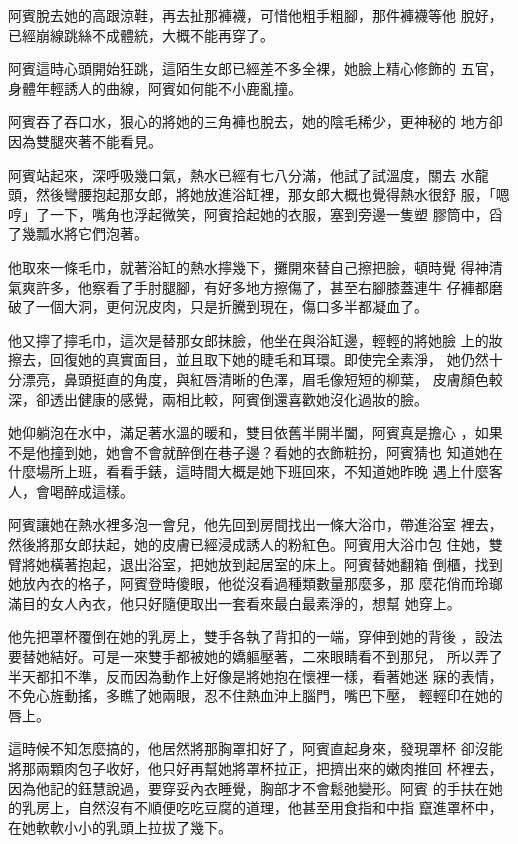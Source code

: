阿賓脫去她的高跟涼鞋，再去扯那褲襪，可惜他粗手粗腳，那件褲襪等他
脫好，已經崩線跳絲不成體統，大概不能再穿了。

阿賓這時心頭開始狂跳，這陌生女郎已經差不多全裸，她臉上精心修飾的
五官，身體年輕誘人的曲線，阿賓如何能不小鹿亂撞。

阿賓吞了吞口水，狠心的將她的三角褲也脫去，她的陰毛稀少，更神秘的
地方卻因為雙腿夾著不能看見。

阿賓站起來，深呼吸幾口氣，熱水已經有七八分滿，他試了試溫度，關去
水龍頭，然後彎腰抱起那女郎，將她放進浴缸裡，那女郎大概也覺得熱水很舒
服，「嗯哼」了一下，嘴角也浮起微笑，阿賓拾起她的衣服，塞到旁邊一隻塑
膠筒中，舀了幾瓢水將它們泡著。

他取來一條毛巾，就著浴缸的熱水擰幾下，攤開來替自己擦把臉，頓時覺
得神清氣爽許多，他察看了手肘腿腳，有好多地方擦傷了，甚至右腳膝蓋連牛
仔褲都磨破了一個大洞，更何況皮肉，只是折騰到現在，傷口多半都凝血了。

他又擰了擰毛巾，這次是替那女郎抹臉，他坐在與浴缸邊，輕輕的將她臉
上的妝擦去，回復她的真實面目，並且取下她的睫毛和耳環。即使完全素淨，
她仍然十分漂亮，鼻頭挺直的角度，與紅唇清晰的色澤，眉毛像短短的柳葉，
皮膚顏色較深，卻透出健康的感覺，兩相比較，阿賓倒還喜歡她沒化過妝的臉。

她仰躺泡在水中，滿足著水溫的暖和，雙目依舊半開半闔，阿賓真是擔心
，如果不是他撞到她，她會不會就醉倒在巷子邊？看她的衣飾粧扮，阿賓猜也
知道她在什麼場所上班，看看手錶，這時間大概是她下班回來，不知道她昨晚
遇上什麼客人，會喝醉成這樣。

阿賓讓她在熱水裡多泡一會兒，他先回到房間找出一條大浴巾，帶進浴室
裡去，然後將那女郎扶起，她的皮膚已經浸成誘人的粉紅色。阿賓用大浴巾包
住她，雙臂將她橫著抱起，退出浴室，把她放到起居室的床上。阿賓替她翻箱
倒櫃，找到她放內衣的格子，阿賓登時傻眼，他從沒看過種類數量那麼多，那
麼花俏而玲瑯滿目的女人內衣，他只好隨便取出一套看來最白最素淨的，想幫
她穿上。

他先把罩杯覆倒在她的乳房上，雙手各執了背扣的一端，穿伸到她的背後
，設法要替她結好。可是一來雙手都被她的嬌軀壓著，二來眼睛看不到那兒，
所以弄了半天都扣不準，反而因為動作上好像是將她抱在懷裡一樣，看著她迷
寐的表情，不免心旌動搖，多瞧了她兩眼，忍不住熱血沖上腦門，嘴巴下壓，
輕輕印在她的唇上。

這時候不知怎麼搞的，他居然將那胸罩扣好了，阿賓直起身來，發現罩杯
卻沒能將那兩顆肉包子收好，他只好再幫她將罩杯拉正，把擠出來的嫩肉推回
杯裡去，因為他記的鈺慧說過，要穿妥內衣睡覺，胸部才不會鬆弛變形。阿賓
的手扶在她的乳房上，自然沒有不順便吃吃豆腐的道理，他甚至用食指和中指
竄進罩杯中，在她軟軟小小的乳頭上拉拔了幾下。

